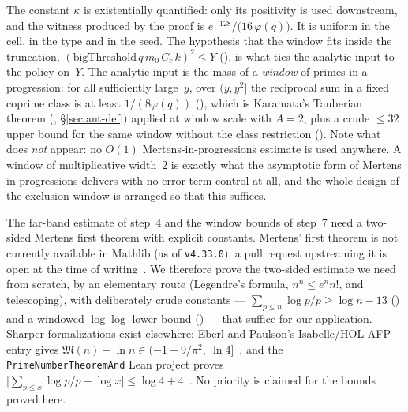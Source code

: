The constant $\kappa$ is existentially quantified: only its positivity is
used downstream, and the witness produced by the proof is
$e^{-128}/\bigl(16\,\varphi(q)\bigr)$.  It is uniform in the cell, in the
type and in the seed.  The hypothesis that the window fits inside the
truncation, $(\mathrm{bigThreshold}\,q\,m_0\,C_c\,k)^2 \le Y$
(), is what ties
the analytic input to the policy on~$Y$.  The analytic input is the mass of a
\emph{window} of primes in a progression: for all sufficiently large~$y$,
over $(y, y^2]$ the reciprocal
sum in a fixed coprime class is at least $1/(8\varphi(q))$
(), which is
Karamata's Tauberian theorem
(,
\S\ref{sec:ant-def}) applied at window scale with $A = 2$, plus a crude
$\le 32$ upper bound for the same window without the class restriction
().  Note what does
\emph{not} appear: no $O(1)$ Mertens-in-progressions estimate is used
anywhere.  A window of multiplicative width~$2$ is exactly what the
asymptotic form of Mertens in progressions delivers with no error-term
control at all, and the whole design of the exclusion window is arranged
so that this suffices.

\begin{remark}
\label{rem:mertens-priorart}
The far-band estimate of step~4 and the window bounds of step~7 need a
two-sided Mertens first theorem with explicit constants.  Mertens' first
theorem is not currently available in Mathlib (as of \texttt{v4.33.0}); a
pull request upstreaming it is open at the time of
writing~\cite{Mathlib41394}.  We therefore prove the two-sided estimate we
need from scratch, by an elementary route (Legendre's formula,
$n^n \le e^n n!$, and telescoping), with deliberately crude constants ---
$\sum_{p\le n}\log p/p \geq \log n - 13$
() and a windowed
$\log\log$ lower bound
() --- that
suffice for our application.  Sharper formalizations exist elsewhere:
Eberl and Paulson's Isabelle/HOL AFP entry gives
$\mathfrak{M}(n) - \ln n \in (-1 - 9/\pi^2,\ \ln 4]$~\cite{EberlPaulsonPNT},
and the \texttt{PrimeNumberTheoremAnd} Lean project proves
$\bigl|\sum_{p \le x} \log p/p - \log x\bigr| \le \log 4 + 4$~\cite{PNTplus}.
No priority is claimed for the bounds proved here.
\end{remark}

